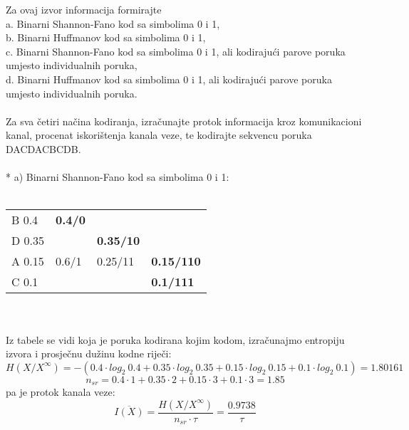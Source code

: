 \documentclass[12pt]{article}
\begin{document}
\begin{enumerate}
Za ovaj izvor informacija formirajte \\
a. Binarni Shannon-Fano kod sa simbolima 0 i 1, \\
b. Binarni Huffmanov kod sa simbolima 0 i 1, \\
c. Binarni Shannon-Fano kod sa simbolima 0 i 1, ali kodirajući parove poruka umjesto individualnih poruka, \\
d. Binarni Huffmanov kod sa simbolima 0 i 1, ali kodirajući parove poruka umjesto individualnih poruka. \\
\\
Za sva četiri načina kodiranja, izračunajte protok informacija kroz komunikacioni kanal, procenat iskorištenja kanala veze, te kodirajte sekvencu poruka DACDACBCDB. \\
\\
* a) Binarni Shannon-Fano kod sa simbolima 0 i 1: 
\\
\\
\begin{tabular}{|l|l|ll}
\cline{1-2}
B 0.4  & \textbf{0.4/0} &                                       &                                        \\ \cline{1-3}
D 0.35 &                & \multicolumn{1}{l|}{\textbf{0.35/10}} &                                        \\ \cline{1-1} \cline{3-4} 
A 0.15 & 0.6/1          & \multicolumn{1}{l|}{0.25/11}          & \multicolumn{1}{l|}{\textbf{0.15/110}} \\ \cline{1-1} \cline{4-4} 
C 0.1  &                & \multicolumn{1}{l|}{}                 & \multicolumn{1}{l|}{\textbf{0.1/111}}  \\ \hline
\end{tabular}
\\
\\
Iz tabele se vidi koja je poruka kodirana kojim kodom, izračunajmo entropiju izvora i prosječnu dužinu kodne riječi:
\begin{equation*}
    H(X/X^\infty) = -(0.4 \cdot log_2~0.4 + 0.35 \cdot log_2~0.35 + 0.15 \cdot log_2~0.15 + 0.1 \cdot log_2~ 0.1) = 1.80161
\end{equation*}
\begin{equation*}
    n_{sr} = 0.4 \cdot 1 + 0.35 \cdot 2 + 0.15 \cdot 3 + 0.1 \cdot 3 = 1.85
\end{equation*}
pa je protok kanala veze:
\begin{equation*}
    \overline{I(X)} = \frac{H(X/X^\infty)}{n_{sr} \cdot \tau} = \frac{0.9738}{\tau}
\end{equation*}

\end{enumerate}
\end{document}
